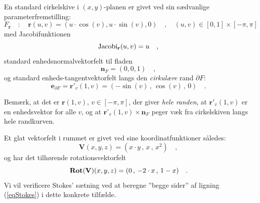 



\begin{example} \label{exampDiskStokes}
En standard cirkelskive i $(x,y)$-planen er givet ved sin sædvanlige parameterfremstilling:
\begin{equation}
F_{\mathbf{r}}\quad : \quad \mathbf{r}(u,v) = (u\cdot \cos(v), u \cdot \sin(v), 0) \quad , \quad (u,v) \in [0, 1] \times [-\pi, \pi]
\end{equation}
med Jacobifunktionen
\begin{equation}
\operatorname{Jacobi}_{\mathbf{r}}(u,v) = u \quad ,
\end{equation}
standard enhedsnormalvektorfelt til fladen
\begin{equation}
\mathbf{n}_{F} = (0,0,1) \quad ,
\end{equation}
og standard enheds-tangentvektorfelt langs den \emph{cirkulære} rand $\partial F$:
\begin{equation}
\mathbf{e}_{\partial F} = \mathbf{r}'_{v}(1, v) = (-\sin(v)\, , \, \cos(v)\, , \, 0 ) \quad .
\end{equation}
\begin{aha}
Bemærk, at det er $\mathbf{r}(1, v)$, $v \in [-\pi, \pi]$,  der giver \emph{hele randen}, at $\mathbf{r}'_{v}(1, v)$ er en enhedsvektor for alle $v$, og at $\mathbf{r}'_{v}(1, v)\times \mathbf{n}_{F}$ peger væk fra cirkelskiven langs hele randkurven.\\
\end{aha}
Et glat vektorfelt i rummet er givet ved sine koordinatfunktioner således:
\begin{equation}
\mathbf{V}(x,y,z) = (x\cdot y \, , \, x \, , \, x^{2}) \quad ,
\end{equation}
og har det tilhørende rotationsvektorfelt
\begin{equation}
\operatorname{\mathbf{Rot}}(\mathbf{V})(x,y,z) = (0\, , \, -2\cdot x \, , \,  1-x) \quad .
\end{equation}
Vi vil verificere Stokes' sætning ved at beregne ''begge sider'' af ligning (\ref{eqStokes}) i dette konkrete tilfælde.\\


\end{example}
